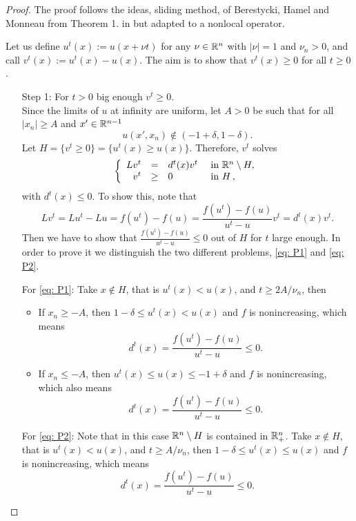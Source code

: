 \begin{proof}
The proof follows the ideas, sliding method, of Berestycki, Hamel and Monneau from Theorem 1. in \cite{BerestyckiHamelMonneau} but adapted to a nonlocal operator.

Let us define $ u^t(x) := u(x+\nu t) $ for any $\nu\in\mathbb{R}^n$ with $|\nu|=1$ and $\nu_n>0$, and call $v^t(x):=u^t(x)-u(x)$. The aim is to show that $v^t(x)\geq 0$ for all $t\geq 0$.

\begin{enumerate}
\item[Step 1:] For $t>0$ big enough $v^t\geq 0$.\\
Since the limits of $u$ at infinity are uniform, let $A>0$ be such that for all $|x_n|\geq A$ and $x'\in \mathbb{R}^{n-1}$
\begin{equation}
\label{Eq: DefinitionA}
u(x',x_n)\not\in (-1+\delta,1-\delta).
\end{equation}
Let $H=\{v^t\geq 0\} = \{u^t(x) \geq u(x)\}$. Therefore, $v^t$ solves
$$
\left\{\begin{array}{rcll}
L v^t &=& d^t(x) v^t  &\textrm{ in }\mathbb{R}^n\setminus H,\\
v^t &\geq& 0  &\textrm{ in } H\,,
\end{array} \right.
$$
with $d^t(x)\leq 0$. To show this, note that
\begin{equation}
\label{Eq: Definition_dt}
Lv^t = Lu^t - Lu = f(u^t) - f(u) = \frac{f(u^t) - f(u)}{u^t-u} v^t = d^t(x) v^t.
\end{equation}
Then we have to show that $ \frac{f(u^t) - f(u)}{u^t-u} \leq 0 $ out of $H$ for $t$ large enough. In order to prove it we distinguish the two different problems, \eqref{eq: P1} and \eqref{eq: P2}.

For \eqref{eq: P1}: Take $x\not\in H$, that is $u^t(x)<u(x)$, and $t\geq 2A/\nu_n$, then
\begin{itemize}
\item If $x_n\geq -A$, then $1-\delta \leq u^t(x) < u(x)$ and $f$ is nonincreasing, which means
$$ d^t(x) = \frac{f(u^t) - f(u)}{u^t-u} \leq 0.  $$
\item If $x_n\leq -A$, then $u^t(x) \leq u(x) \leq -1+\delta$ and $f$ is nonincreasing, which also means
$$ d^t(x) = \frac{f(u^t) - f(u)}{u^t-u} \leq 0.  $$
\end{itemize}

For \eqref{eq: P2}: Note that in this case $\mathbb{R}^n\setminus H$ is contained in $\mathbb{R}^n_+$. Take $x\not\in H$, that is $u^t(x)<u(x)$, and $t\geq A/\nu_n$, then $1-\delta \leq u^t(x) \leq u(x)$ and $f$ is nonincreasing, which means
$$ d^t(x) = \frac{f(u^t) - f(u)}{u^t-u} \leq 0.  $$


\end{enumerate}
\end{proof}
